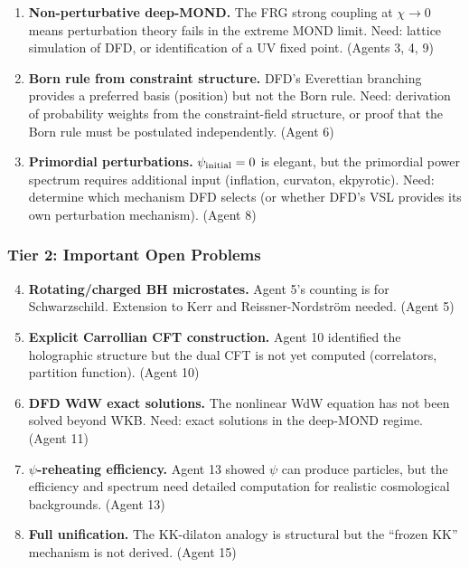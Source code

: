 \documentclass[11pt,a4paper]{article}
\begin{document}
\begin{enumerate}
\item \textbf{Non-perturbative deep-MOND.} The FRG strong coupling at $\chi \to 0$ means perturbation theory fails in the extreme MOND limit. Need: lattice simulation of DFD, or identification of a UV fixed point. (Agents 3, 4, 9)

\item \textbf{Born rule from constraint structure.} DFD's Everettian branching provides a preferred basis (position) but not the Born rule. Need: derivation of probability weights from the constraint-field structure, or proof that the Born rule must be postulated independently. (Agent 6)

\item \textbf{Primordial perturbations.} $\psi_{\rm initial} = 0$ is elegant, but the primordial power spectrum requires additional input (inflation, curvaton, ekpyrotic). Need: determine which mechanism DFD selects (or whether DFD's VSL provides its own perturbation mechanism). (Agent 8)
\end{enumerate}

\subsubsection{Tier 2: Important Open Problems}

\begin{enumerate}
\setcounter{enumi}{3}
\item \textbf{Rotating/charged BH microstates.} Agent 5's counting is for Schwarzschild. Extension to Kerr and Reissner-Nordstr\"om needed. (Agent 5)

\item \textbf{Explicit Carrollian CFT construction.} Agent 10 identified the holographic structure but the dual CFT is not yet computed (correlators, partition function). (Agent 10)

\item \textbf{DFD WdW exact solutions.} The nonlinear WdW equation has not been solved beyond WKB. Need: exact solutions in the deep-MOND regime. (Agent 11)

\item \textbf{$\psi$-reheating efficiency.} Agent 13 showed $\psi$ can produce particles, but the efficiency and spectrum need detailed computation for realistic cosmological backgrounds. (Agent 13)

\item \textbf{Full unification.} The KK-dilaton analogy is structural but the ``frozen KK'' mechanism is not derived. (Agent 15)
\end{enumerate}
\end{document}
